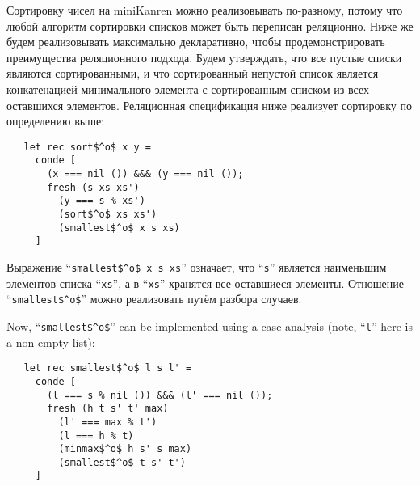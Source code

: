 Сортировку чисел на miniKanren можно реализовывать по-разному, потому что любой алгоритм сортировки списков может быть переписан реляционно.
Ниже же будем реализовывать максимально декларативно, чтобы продемонстрировать преимущества реляционного подхода.
Будем утверждать, что все пустые списки являются сортированными, и что сортированный непустой список является конкатенацией минимального элемента с сортированным списком из всех оставшихся элементов. Реляционная спецификация ниже реализует сортировку по определению выше:



\begin{lstlisting}
   let rec sort$^o$ x y =
     conde [
       (x === nil ()) &&& (y === nil ());
       fresh (s xs xs')
         (y === s % xs')
         (sort$^o$ xs xs')
         (smallest$^o$ x s xs)
     ]
\end{lstlisting}

Выражение \enquote{\lstinline|smallest$^o$ x s xs|} означает, что \enquote{\lstinline|s|} является наименьшим элементов списка \enquote{\lstinline|xs|}, а в  \enquote{\lstinline|xs|} хранятся все оставшиеся элементы.
Отношение \enquote{\lstinline|smallest$^o$|} можно реализовать путём разбора случаев.

Now, \enquote{\lstinline|smallest$^o$|} can be implemented using a case analysis (note, \enquote{\lstinline|l|} here is a non-empty list):

\begin{lstlisting}
   let rec smallest$^o$ l s l' =
     conde [
       (l === s % nil ()) &&& (l' === nil ());
       fresh (h t s' t' max)
         (l' === max % t')
         (l === h % t)
         (minmax$^o$ h s' s max)
         (smallest$^o$ t s' t')
     ]
\end{lstlisting}

